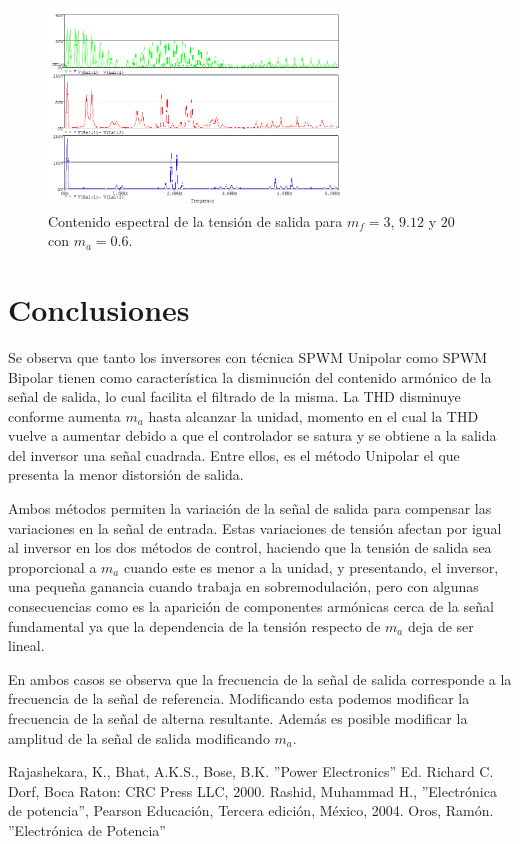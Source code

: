 \documentclass[conference]{IEEEtran}
\begin{document}
\begin{figure}[b]
	\centering
	\includegraphics[width=8cm]{imagenes/unipolar/mf}
	\caption{Contenido espectral de la tensión de salida para $m_f = 3$, $9.12$ y $20$ con $m_a = 0.6$.}
	\label{fig:mfuni}
\end{figure}


\section{Conclusiones}
Se observa que tanto los inversores con técnica SPWM Unipolar como SPWM Bipolar tienen como característica la disminución del contenido armónico de la señal de salida, lo cual facilita el filtrado de la misma. La THD disminuye conforme aumenta $m_a$ hasta alcanzar la unidad, momento en el cual la THD vuelve a aumentar debido a que el controlador se satura y se obtiene a la salida del inversor una señal cuadrada. Entre ellos, es el método Unipolar el que presenta la menor distorsión de salida.

Ambos métodos permiten la variación de la señal de salida para compensar las variaciones en la señal de entrada. Estas variaciones de tensión afectan por igual al inversor en los dos métodos de control, haciendo que la tensión de salida sea proporcional a $m_a$ cuando este es menor a la unidad, y presentando, el inversor, una pequeña ganancia cuando trabaja en sobremodulación, pero con algunas consecuencias como es la aparición de componentes armónicas cerca de la señal fundamental ya que la dependencia de la tensión respecto de $m_a$ deja de ser lineal.

En ambos casos se observa que la frecuencia de la señal de salida corresponde a la frecuencia de la señal de referencia. Modificando esta podemos modificar la frecuencia de la señal de alterna resultante. Además es posible modificar la amplitud de la señal de salida modificando $m_a$.

\begin{thebibliography}{1}
	Rajashekara, K., Bhat, A.K.S., Bose, B.K. ''Power Electronics'' Ed. Richard C. Dorf, Boca Raton: CRC Press LLC, 2000.
	Rashid, Muhammad H., ''Electrónica de potencia'', Pearson Educación, Tercera edición, México, 2004.
	Oros, Ramón. ''Electrónica de Potencia''
\end{thebibliography}
\end{document}
